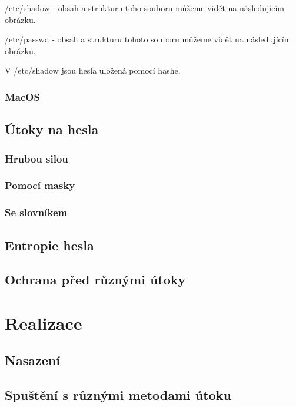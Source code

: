 \documentclass[thesis=B,czech]{FITthesis}[2019/12/23]
\begin{document}
/etc/shadow - obsah a strukturu toho souboru můžeme vidět na následujícím obrázku. 


/etc/passwd - obsah a strukturu tohoto souboru můžeme vidět na následujícím obrázku.


V /etc/shadow jsou hesla uložená pomocí hashe. 

\subsection{MacOS}


\section{Útoky na hesla}

\subsection{Hrubou silou}

\subsection{Pomocí masky}

\subsection{Se slovníkem}

\section{Entropie hesla}

\section{Ochrana před různými útoky}

\chapter{Realizace}

\section{Nasazení}

\section{Spuštění s různými metodami útoku}
\end{document}
